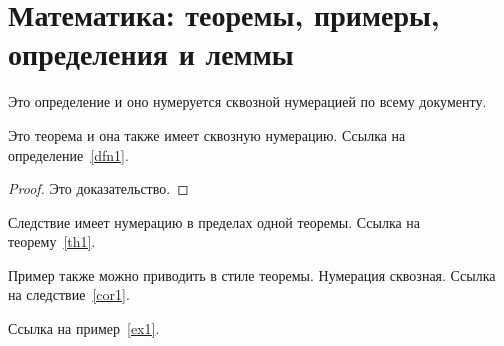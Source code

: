 \section{Математика: теоремы, примеры, определения и леммы}

\begin{definition}\label{dfn1}
    Это определение и оно нумеруется сквозной нумерацией по всему документу.
\end{definition}

\begin{theorem}\label{th1}
    Это теорема и она также имеет сквозную нумерацию. Ссылка на определение~\ref{dfn1}.
\end{theorem}
\begin{proof}
    Это доказательство.
\end{proof}

\begin{corollary}\label{cor1}
    Следствие имеет нумерацию в пределах одной теоремы. Ссылка на теорему~\ref{th1}.
\end{corollary}

\begin{example}\label{ex1}
    Пример также можно приводить в стиле теоремы. Нумерация сквозная. Ссылка на следствие~\ref{cor1}.
\end{example}

Ссылка на пример~\ref{ex1}.